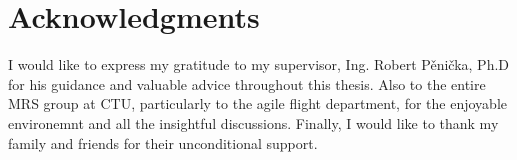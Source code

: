 
\section*{Acknowledgments}

I would like to express my gratitude to my supervisor, Ing. Robert Pěnička, Ph.D for his guidance and valuable advice throughout this thesis.
Also to the entire MRS group at CTU, particularly to the agile flight department, for the enjoyable environemnt and all the insightful discussions.
Finally, I would like to thank my family and friends for their unconditional support.

\vspace{2.5cm}
